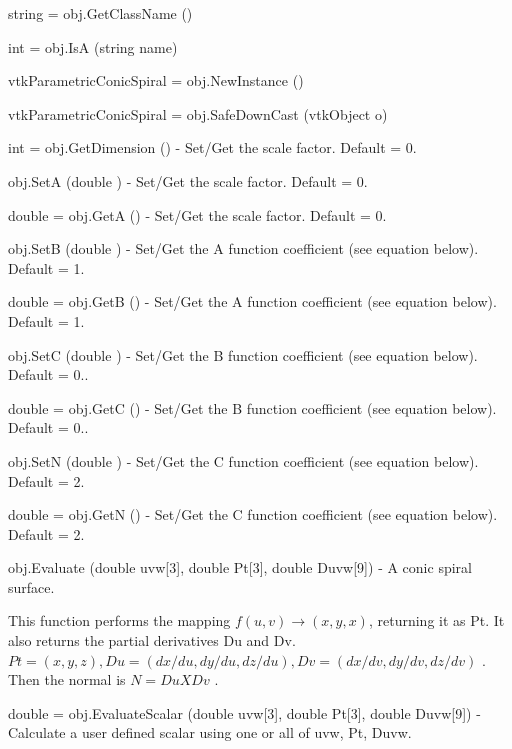\begin{DoxyItemize}
\item {\ttfamily string = obj.\-Get\-Class\-Name ()}  
\item {\ttfamily int = obj.\-Is\-A (string name)}  
\item {\ttfamily vtk\-Parametric\-Conic\-Spiral = obj.\-New\-Instance ()}  
\item {\ttfamily vtk\-Parametric\-Conic\-Spiral = obj.\-Safe\-Down\-Cast (vtk\-Object o)}  
\item {\ttfamily int = obj.\-Get\-Dimension ()} -\/ Set/\-Get the scale factor. Default = 0.  
\item {\ttfamily obj.\-Set\-A (double )} -\/ Set/\-Get the scale factor. Default = 0.  
\item {\ttfamily double = obj.\-Get\-A ()} -\/ Set/\-Get the scale factor. Default = 0.  
\item {\ttfamily obj.\-Set\-B (double )} -\/ Set/\-Get the A function coefficient (see equation below). Default = 1.  
\item {\ttfamily double = obj.\-Get\-B ()} -\/ Set/\-Get the A function coefficient (see equation below). Default = 1.  
\item {\ttfamily obj.\-Set\-C (double )} -\/ Set/\-Get the B function coefficient (see equation below). Default = 0..  
\item {\ttfamily double = obj.\-Get\-C ()} -\/ Set/\-Get the B function coefficient (see equation below). Default = 0..  
\item {\ttfamily obj.\-Set\-N (double )} -\/ Set/\-Get the C function coefficient (see equation below). Default = 2.  
\item {\ttfamily double = obj.\-Get\-N ()} -\/ Set/\-Get the C function coefficient (see equation below). Default = 2.  
\item {\ttfamily obj.\-Evaluate (double uvw\mbox{[}3\mbox{]}, double Pt\mbox{[}3\mbox{]}, double Duvw\mbox{[}9\mbox{]})} -\/ A conic spiral surface.

This function performs the mapping $f(u,v) \rightarrow (x,y,x)$, returning it as Pt. It also returns the partial derivatives Du and Dv. $Pt = (x, y, z), Du = (dx/du, dy/du, dz/du), Dv = (dx/dv, dy/dv, dz/dv)$ . Then the normal is $N = Du X Dv$ .  
\item {\ttfamily double = obj.\-Evaluate\-Scalar (double uvw\mbox{[}3\mbox{]}, double Pt\mbox{[}3\mbox{]}, double Duvw\mbox{[}9\mbox{]})} -\/ Calculate a user defined scalar using one or all of uvw, Pt, Duvw.


\end{DoxyItemize}
